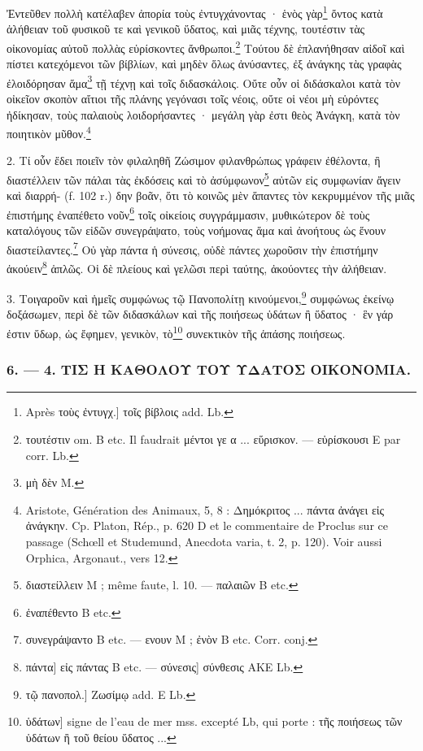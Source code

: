 \documentclass[a4paper, 11pt, oneside, polutonikogreek, french]{article}
\begin{document}
Ἐντεῦθεν πολλὴ κατέλαβεν ἀπορία τοὺς ἐντυγχάνοντας · ἑνὸς γὰρ\footnote{Après τοὺς ἐντυγχ.] τοῖς βίβλοις add. Lb.} ὄντος κατὰ ἀλήθειαν τοῦ φυσικοῦ τε καὶ γενικοῦ ὕδατος, καὶ μιᾶς τέχνης, τουτέστιν τὰς οἰκονομίας αὐτοῦ πολλὰς εὑρίσκοντες ἄνθρωποι.\footnote{τουτέστιν om. B etc. Il faudrait μέντοι γε α ... εὕρισκον. --- εὑρίσκουσι E par corr. Lb.} Τούτου δὲ ἐπλανήθησαν αἰδοῖ καὶ πίστει κατεχόμενοι τῶν βίβλίων, καὶ μηδὲν ὅλως ἀνύσαντες, ἐξ ἀνάγκης τὰς γραφὰς ἐλοιδόρησαν ἅμα\footnote{μὴ δὲν M.} τῇ τέχνῃ καὶ τοῖς διδασκάλοις. Οὔτε οὖν οἱ διδάσκαλοι κατὰ τὸν οἰκεῖον σκοπὸν αἴτιοι τῆς πλάνης γεγόνασι τοῖς νέοις, οὔτε οἱ νέοι μὴ εὑρόντες ἠδίκησαν, τοὺς παλαιοὺς λοιδορήσαντες · μεγάλη γὰρ ἐστι θεὸς Ἀνάγκη, κατὰ τὸν ποιητικὸν μῦθον.\footnote{Aristote, Génération des Animaux, 5, 8 : Δημόκριτος ... πάντα ἀνάγει εἰς ἀνάγκην. Cp. Platon, Rép., p. 620 D et le commentaire de Proclus sur ce passage (Schœll et Studemund, Anecdota varia, t. 2, p. 120). Voir aussi Orphica, Argonaut., vers 12.}

2. Τί οὖν ἔδει ποιεῖν τὸν φιλαληθῆ Ζώσιμον φιλανθρώπως γράφειν ἐθέλοντα, ἢ διαστέλλειν τῶν πάλαι τὰς ἐκδόσεις καὶ τὸ ἀσύμφωνον\footnote{διαστείλλειν M ; même faute, l. 10. --- παλαιῶν B etc.} αὐτῶν εἰς συμφωνίαν ἄγειν καὶ διαρρή- (f. 102 r.) δην βοᾶν, ὅτι τὸ κοινῶς μὲν ἅπαντες τὸν κεκρυμμένον τῆς μιᾶς ἐπιστήμης ἐναπέθετο νοῦν\footnote{ἐναπέθεντο B etc.} τοῖς οἰκείοις συγγράμμασιν, μυθικώτερον δὲ τοὺς καταλόγους τῶν εἰδῶν συνεγράψατο, τοὺς νοήμονας ἅμα καὶ ἀνοήτους ὡς ἕνουν διαστείλαντες.\footnote{συνεγράψαντο B etc. --- ενουν M ; ἐνὸν B etc. Corr. conj.} Οὐ γὰρ πάντα ἡ σύνεσις, οὐδὲ πάντες χωροῦσιν τὴν ἐπιστήμην ἀκούειν\footnote{πάντα] εἰς πάντας B etc. --- σύνεσις] σύνθεσις AKE Lb.} ἁπλῶς. Οἱ δὲ πλείους καὶ γελῶσι περὶ ταύτης, ἀκούοντες τὴν ἀλήθειαν.

3. Τοιγαροῦν καὶ ἡμεῖς συμφώνως τῷ Πανοπολίτῃ κινούμενοι,\footnote{τῷ πανοπολ.] Ζωσίμῳ add. E Lb.} συμφώνως ἐκείνῳ δοξάσωμεν, περὶ δὲ τῶν διδασκάλων καὶ τῆς ποιήσεως ὑδάτων ἢ ὕδατος · ἓν γάρ ἐστιν ὕδωρ, ὡς ἔφημεν, γενικὸν, τὸ\footnote{ὑδάτων] signe de l'eau de mer mss. excepté Lb, qui porte : τῆς ποιήσεως τῶν ὑδάτων ἢ τοῦ θείου ὕδατος ...} συνεκτικὸν τῆς ἁπάσης ποιήσεως.

\bigskip
\centerline{\EightStarTaper}
\centerline{\EightStarTaper\EightStarTaper}
\bigskip

\subsubsection{6. --- 4. ΤΙΣ Η ΚΑΘΟΛΟΥ ΤΟΥ ΥΔΑΤΟΣ ΟΙΚΟΝΟΜΙΑ.}
\end{document}
